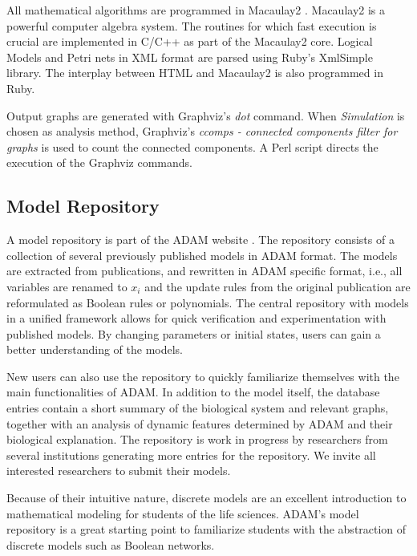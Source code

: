 \documentclass[10pt]{bmc_article}
\newenvironment{bmcformat}{\begin{raggedright}\baselineskip20pt\sloppy\setboolean{publ}{false}}{\end{raggedright}\baselineskip20pt\sloppy}
\begin{document}
\begin{bmcformat}
All mathematical algorithms are programmed in Macaulay2 \cite{M2}. Macaulay2 is a powerful computer algebra system. The routines for which fast execution is crucial are implemented in C/C++ as part of the Macaulay2 core. Logical Models and Petri nets in XML format are parsed using Ruby's XmlSimple library. The interplay between HTML and Macaulay2 is also programmed in Ruby.

Output graphs are generated with Graphviz's {\it dot} command. When {\it Simulation} is chosen as analysis method, Graphviz's {\it ccomps - connected components filter for graphs} is used to count the connected components. A Perl script directs the execution of the Graphviz commands.
\subsection*{Model Repository}
A model repository is part of the ADAM website \cite{ADAMRepo}. The repository consists of a collection of several previously published models in ADAM format. The models are extracted from publications, and rewritten in ADAM specific format, i.e., all variables are renamed to $x_i$ and the update rules from the original publication are reformulated as Boolean rules or polynomials. The central repository with models in a unified framework allows for quick verification and experimentation with published models. By changing parameters or initial states, users can gain a better understanding of the models.

New users can also use the repository to quickly familiarize themselves with the main functionalities of ADAM. In addition to the model itself, the database entries contain a short summary of the biological system and relevant graphs, together with an analysis of dynamic features determined by ADAM and their biological explanation. The repository is work in progress by researchers from several institutions generating more entries for the repository. We invite all interested researchers to submit their models.


Because of their intuitive nature, discrete models are an excellent introduction to mathematical modeling for students of the life sciences. ADAM's model repository is a great starting point to familiarize students with the abstraction of discrete models such as Boolean networks.
 

\end{bmcformat}
\end{document}
